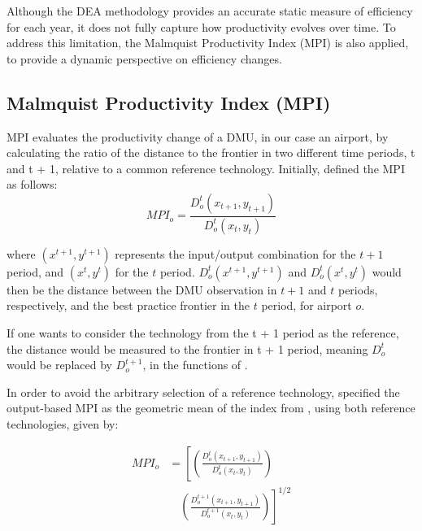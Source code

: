 \vspace{-0.2cm}
 Although the DEA methodology provides an accurate
static measure of efficiency for each year, it does not fully capture how productivity evolves over
time. To address this limitation, the Malmquist Productivity Index (MPI) is also applied, to provide a
dynamic perspective on efficiency changes.

\subsection{Malmquist Productivity Index (MPI)}
\label{mpi}

MPI evaluates the productivity change of a DMU, in our case an airport, by calculating the ratio of
the distance to the frontier in two different time periods, t and t + 1, relative to a common reference
technology. Initially, \cite{caves1982} defined the MPI as follows:
\vspace{-0.01cm}
\begin{equation}   
    \label{eq:MI1} 
MPI_{o} = \frac{D^{t}_{o}\left(x_{t+1}, y_{t+1}\right)}{D^{t}_{o}\left(x_{t}, y_{t}\right)}         
\end{equation}

where $\left(x^{t+1}, y^{t+1}\right)$ represents the input/output combination for the $t+1$ period, and $\left(x^{t}, y^{t}\right)$  for the $t$ period. $D^{t}_{o}\left(x^{t+1}, y^{t+1}\right)$ and $D^{t}_{o}\left(x^{t}, y^{t}\right)$ would then be the distance between the DMU observation in $t+1$ and $t$ periods, respectively, and the best practice frontier in the $t$ period, for airport $o$. 

If one wants to consider the technology from the t + 1 period as the reference, the distance would be measured to the frontier in t + 1 period, meaning $D^{t}_{o}$ would be replaced by $D^{t+1}_{o}$, in the functions of . 

In order to avoid the arbitrary selection of a reference technology, \cite{fare1994} specified the
output-based MPI as the geometric mean of the index from , using both reference technologies, given by:




\begin{equation}
    \label{eq:MI3}
\begin{aligned}
MPI_{o} &= \left[ \left( \frac{D^{t}_{o}(x_{t+1}, y_{t+1})}{D^{t}_{o}(x_{t}, y_{t})} \right) \right. \\
&\quad \left. \left( \frac{D^{t+1}_{o}(x_{t+1}, y_{t+1})}{D^{t+1}_{o}(x_{t}, y_{t})} \right) \right]^{1/2}
\end{aligned}
\end{equation}

